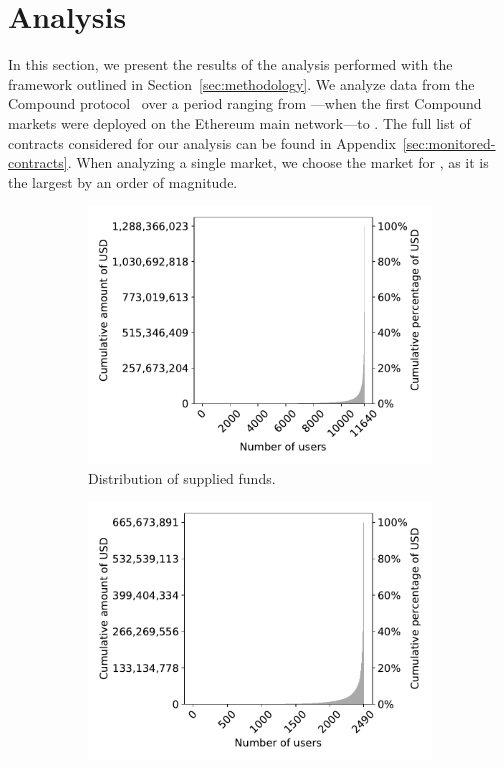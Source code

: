 \section{Analysis}
\label{sec:analysis}
In this section, we present the results of the analysis performed with the framework outlined in Section~\ref{sec:methodology}.
We analyze data from the Compound protocol~\cite{Leshner2018} over a period ranging from \StartDate---when the first Compound markets were deployed on the Ethereum main network---to \EndDate.
The full list of contracts considered for our analysis can be found in Appendix~\ref{sec:monitored-contracts}.
When analyzing a single market, we choose the market for , as it is the largest by an order of magnitude.

\begin{figure}[tbp]
  \begin{subfigure}{.5\textwidth}
    \centering
    \includegraphics[width=\textwidth]{./6-application-security/figures/suppliers-distribution.pdf}
    \caption{Distribution of supplied funds.}
    \label{fig:suppliers-distribution}
  \end{subfigure}
  \begin{subfigure}{.5\textwidth}
    \centering
    \includegraphics[width=\textwidth]{./6-application-security/figures/borrowers-distribution.pdf}

\end{subfigure}
\end{figure}
